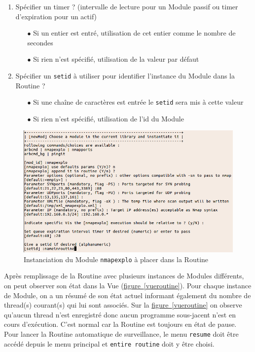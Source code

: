 \documentclass[]{article}
\newcommand{\wordlink}[2]{\hyperref[#1]{#2~\ref{#1}}}
\begin{document}
\begin{enumerate}
\begin{itemize}
	\end{itemize}
\vspace{0.2cm}
\item Spécifier un timer ? (intervalle de lecture pour un Module passif ou timer d'expiration pour un actif)
	\begin{itemize}
	\item[$\bullet$] Si un entier est entré, utilisation de cet entier comme le nombre de secondes
	\item[$\bullet$] Si rien n'est spécifié, utilisation de la valeur par défaut
	\end{itemize}
\vspace{0.2cm}
\item Spécifier un \texttt{setid} à utiliser pour identifier l'instance du Module dans la Routine ?
	\begin{itemize}
	\item[$\bullet$] Si une chaîne de caractères est entrée le \texttt{setid} sera mis à cette valeur
	\item[$\bullet$] Si rien n'est spécifié, utilisation de l'id du Module
	\end{itemize}
\vspace{0.2cm}
\end{enumerate}

\begin{figure}[!ht]
\centering
     \includegraphics[width=0.85\linewidth]{newmod}
     \caption{Instanciation du Module \texttt{nmapexplo} à placer dans la Routine}
     \label{newmod}
\end{figure}

\newpage

Après remplissage de la Routine avec plusieurs instances de Modules différents, on peut observer son état dans la Vue (\wordlink{vueroutine}{figure}). Pour chaque instance de Module, on a un résumé de son état actuel informant également du nombre de thread(s) courant(s) qui lui sont associés. Sur la \wordlink{vueroutine}{figure} on observe qu'aucun thread n'est enregistré donc aucun programme sous-jacent n'est en cours d'exécution. C'est normal car la Routine est toujours en état de pause. Pour lancer la Routine automatique de surveillance, le menu \texttt{resume} doit être accédé depuis le menu principal et \texttt{entire routine} doit y être choisi. 
\end{document}

